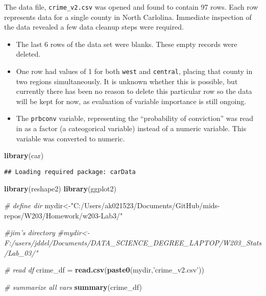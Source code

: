 \documentclass[]{article}
\newenvironment{Shaded}{\begin{snugshade}}{\end{snugshade}}
\newcommand{\KeywordTok}[1]{\textcolor[rgb]{0.13,0.29,0.53}{\textbf{#1}}}
\newcommand{\StringTok}[1]{\textcolor[rgb]{0.31,0.60,0.02}{#1}}
\newcommand{\CommentTok}[1]{\textcolor[rgb]{0.56,0.35,0.01}{\textit{#1}}}
\newcommand{\NormalTok}[1]{#1}
\providecommand{\tightlist}{%
  \setlength{\itemsep}{0pt}\setlength{\parskip}{0pt}}
\begin{document}
The data file, \texttt{crime\_v2.csv} was opened and found to contain 97
rows. Each row represents data for a single county in North Carlolina.
Immediate inspection of the data revealed a few data cleanup steps were
required.

\begin{itemize}
\tightlist
\item
  The last 6 rows of the data set were blanks. These empty records were
  deleted.
\item
  One row had values of 1 for both \texttt{west} and \texttt{central},
  placing that county in two regions simultaneously. It is unknown
  whether this is possible, but currently there has been no reason to
  delete this particular row so the data will be kept for now, as
  evaluation of variable importance is still ongoing.
\item
  The \texttt{prbconv} variable, representing the ``probability of
  conviction'' was read in as a factor (a cateogorical variable) instead
  of a numeric variable. This variable was converted to numeric.
\end{itemize}

\begin{Shaded}
\begin{Highlighting}[]
\KeywordTok{library}\NormalTok{(car)}
\end{Highlighting}
\end{Shaded}

\begin{verbatim}
## Loading required package: carData
\end{verbatim}

\begin{Shaded}
\begin{Highlighting}[]
\KeywordTok{library}\NormalTok{(reshape2)}
\KeywordTok{library}\NormalTok{(ggplot2)}

\CommentTok{# define dir}
\NormalTok{mydir<-}\StringTok{"C:/Users/ak021523/Documents/GitHub/mids-repos/W203/Homework/w203-Lab3/"}

\CommentTok{#jim's directory}
\CommentTok{#mydir<- F:/users/jddel/Documents/DATA_SCIENCE_DEGREE_LAPTOP/W203_Stats/Lab_03/"}

\CommentTok{# read df}
\NormalTok{crime_df =}\StringTok{ }\KeywordTok{read.csv}\NormalTok{(}\KeywordTok{paste0}\NormalTok{(mydir,}\StringTok{'crime_v2.csv'}\NormalTok{))}

\CommentTok{# summarize all vars}
\KeywordTok{summary}\NormalTok{(crime_df)}
\end{Highlighting}
\end{Shaded}
\end{document}
